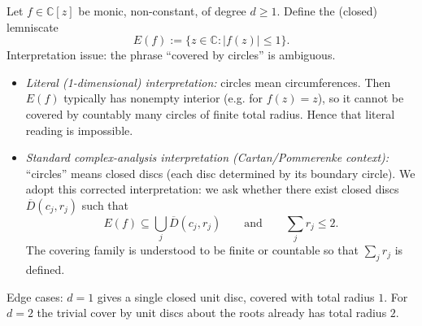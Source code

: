 Let $f\in\mathbb{C}[z]$ be monic, non-constant, of degree $d\ge 1$. Define the (closed) lemniscate
\[
E(f):=\{z\in\mathbb{C}: |f(z)|\le 1\}.
\]
Interpretation issue: the phrase ``covered by circles'' is ambiguous.

\begin{itemize}
\item \emph{Literal (1-dimensional) interpretation:} circles mean circumferences. Then $E(f)$ typically has nonempty interior (e.g. for $f(z)=z$), so it cannot be covered by countably many circles of finite total radius. Hence that literal reading is impossible.
\item \emph{Standard complex-analysis interpretation (Cartan/Pommerenke context):} ``circles'' means closed discs (each disc determined by its boundary circle). We adopt this corrected interpretation: we ask whether there exist closed discs $\overline{D}(c_j,r_j)$ such that
\[
E(f)\subseteq \bigcup_j \overline{D}(c_j,r_j)
\qquad\text{and}\qquad \sum_j r_j\le 2.
\]
The covering family is understood to be finite or countable so that $\sum_j r_j$ is defined.
\end{itemize}

Edge cases: $d=1$ gives a single closed unit disc, covered with total radius $1$. For $d=2$ the trivial cover by unit discs about the roots already has total radius $2$.
